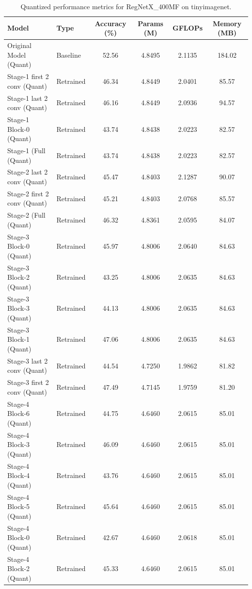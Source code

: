 \begin{table}
\caption{Quantized performance metrics for RegNetX_400MF on tinyimagenet.}
\label{tab:RegNetX_400MF_tinyimagenet_quant}
\begin{tabular}{llcccc}
\toprule
Model & Type & Accuracy (\%) & Params (M) & GFLOPs & Memory (MB) \\
\midrule
Original Model
(Quant) & Baseline & 52.56 & 4.8495 & 2.1135 & 184.02 \\
Stage-1 first 2 conv
(Quant) & Retrained & 46.34 & 4.8449 & 2.0401 & 85.57 \\
Stage-1 last 2 conv
(Quant) & Retrained & 46.16 & 4.8449 & 2.0936 & 94.57 \\
Stage-1 Block-0
(Quant) & Retrained & 43.74 & 4.8438 & 2.0223 & 82.57 \\
Stage-1 (Full
(Quant) & Retrained & 43.74 & 4.8438 & 2.0223 & 82.57 \\
Stage-2 last 2 conv
(Quant) & Retrained & 45.47 & 4.8403 & 2.1287 & 90.07 \\
Stage-2 first 2 conv
(Quant) & Retrained & 45.21 & 4.8403 & 2.0768 & 85.57 \\
Stage-2 (Full
(Quant) & Retrained & 46.32 & 4.8361 & 2.0595 & 84.07 \\
Stage-3 Block-0
(Quant) & Retrained & 45.97 & 4.8006 & 2.0640 & 84.63 \\
Stage-3 Block-2
(Quant) & Retrained & 43.25 & 4.8006 & 2.0635 & 84.63 \\
Stage-3 Block-3
(Quant) & Retrained & 44.13 & 4.8006 & 2.0635 & 84.63 \\
Stage-3 Block-1
(Quant) & Retrained & 47.06 & 4.8006 & 2.0635 & 84.63 \\
Stage-3 last 2 conv
(Quant) & Retrained & 44.54 & 4.7250 & 1.9862 & 81.82 \\
Stage-3 first 2 conv
(Quant) & Retrained & 47.49 & 4.7145 & 1.9759 & 81.20 \\
Stage-4 Block-6
(Quant) & Retrained & 44.75 & 4.6460 & 2.0615 & 85.01 \\
Stage-4 Block-3
(Quant) & Retrained & 46.09 & 4.6460 & 2.0615 & 85.01 \\
Stage-4 Block-4
(Quant) & Retrained & 43.76 & 4.6460 & 2.0615 & 85.01 \\
Stage-4 Block-5
(Quant) & Retrained & 45.64 & 4.6460 & 2.0615 & 85.01 \\
Stage-4 Block-0
(Quant) & Retrained & 42.67 & 4.6460 & 2.0618 & 85.01 \\
Stage-4 Block-2
(Quant) & Retrained & 45.33 & 4.6460 & 2.0615 & 85.01 \\

\end{tabular}
\end{table}
